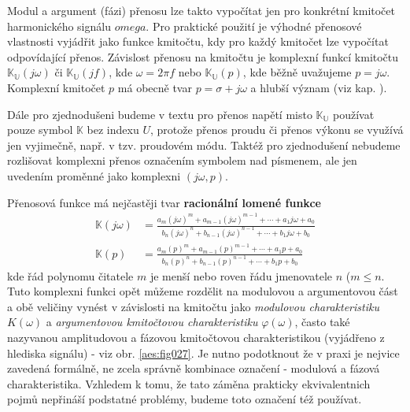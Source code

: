       Modul a argument (fázi) přenosu lze takto vypočítat jen pro konkrétní kmitočet harmonického
      signálu \(omega\). Pro praktické použití je výhodné přenosové vlastnosti vyjádřit jako
      funkce kmitočtu, kdy pro každý kmitočet lze vypočítat odpovídající přenos. Závislost přenosu
      na kmitočtu je komplexní funkcí kmitočtu \(\mathbb{K_U}(j\omega)\) či \(\mathbb{K_U}(jf)\),
      kde \(\omega = 2\pi f\) nebo \(\mathbb{K_U}(p)\), kde běžně uvažujeme \(p = j\omega\).
      Komplexní kmitočet \(p\) má obecně tvar \(p = \sigma + j\omega\) a hlubší význam (viz kap.
      ).
      
      \begin{mdframed}[style=mdnote]
        \begin{note}
          Dále pro zjednodušeni budeme v textu pro přenos napětí misto \(\mathbb{K_U}\) používat
          pouze symbol \(\mathbb{K}\) bez indexu \(U\), protože přenos proudu či přenos výkonu se
          využívá jen vyjimečně, např. v tzv. proudovém módu. Taktéž pro zjednodušení nebudeme
          rozlišovat komplexni přenos označením symbolem nad písmenem, ale jen uvedením proměnné
          jako komplexni \((j\omega, p)\). 
        \end{note}
      \end{mdframed}

      Přenosová funkce má nejčastěji tvar \textbf{racionální lomené funkce}
      \begin{subequations}
        \begin{align}
          \mathbb{K}(j\omega) 
            &= \frac{a_m(j\omega)^m + a_{m-1}(j\omega)^{m-1} + \cdots + a_1j\omega +a_0}
                    {b_n(j\omega)^n + b_{n-1}(j\omega)^{n-1} + \cdots + b_1j\omega +b_0}  
                    \label{aes:eq027a}                                                        \\
          \mathbb{K}(p) 
            &= \frac{a_m(p)^m + a_{m-1}(p)^{m-1} + \cdots + a_1p +a_0}
                    {b_n(p)^n + b_{n-1}(p)^{n-1} + \cdots + b_1p +b_0} 
                    \label{aes:eq027b}
        \end{align}
      \end{subequations}      
      kde řád polynomu čitatele \(m\) je menší nebo roven řádu jmenovatele \(n\) (\(m \leq n\).
      Tuto komplexni funkci opět můžeme rozdělit na modulovou a argumentovou část a obě veličiny
      vynést v závislosti na kmitočtu jako \emph{modulovou charakteristiku} \(K(\omega)\) a
      \emph{argumentovou kmitočtovou charakteristiku} \(\varphi(\omega)\), často také nazyvanou
      amplitudovou a fázovou kmitočtovou charakteristikou (vyjádřeno z hlediska signálu) - viz obr.
      \ref{aes:fig027}. Je nutno podotknout že v praxi je nejvice zavedená formálně, ne zcela
      správně kombinace označení - modulová a fázová charakteristika. Vzhledem k tomu, že tato
      záměna prakticky ekvivalentnich pojmů nepřináší podstatné problémy, budeme toto označení též
      používat.
      
